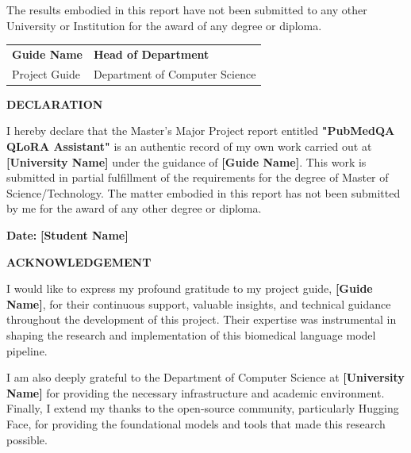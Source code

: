 \documentclass[12pt,a4paper]{report}
\begin{document}
The results embodied in this report have not been submitted to any other University or Institution for the award of any degree or diploma.

\vspace{3cm}
\noindent
\begin{tabular}{@{}p{}p{}@{}}
\textbf{Guide Name} & \textbf{Head of Department} \\
Project Guide & Department of Computer Science \\
\end{tabular}

\newpage
\thispagestyle{empty}
\begin{center}
    \Large \textbf{DECLARATION}
\end{center}
\vspace{1cm}
I hereby declare that the Master's Major Project report entitled \textbf{"PubMedQA QLoRA Assistant"} is an authentic record of my own work carried out at \textbf{[University Name]} under the guidance of \textbf{[Guide Name]}. This work is submitted in partial fulfillment of the requirements for the degree of Master of Science/Technology. The matter embodied in this report has not been submitted by me for the award of any other degree or diploma.

\vspace{3cm}
\noindent
\textbf{Date:} \hspace{8cm} \textbf{[Student Name]}

\newpage
\thispagestyle{empty}
\begin{center}
    \Large \textbf{ACKNOWLEDGEMENT}
\end{center}
\vspace{1cm}
I would like to express my profound gratitude to my project guide, \textbf{[Guide Name]}, for their continuous support, valuable insights, and technical guidance throughout the development of this project. Their expertise was instrumental in shaping the research and implementation of this biomedical language model pipeline.

I am also deeply grateful to the Department of Computer Science at \textbf{[University Name]} for providing the necessary infrastructure and academic environment. Finally, I extend my thanks to the open-source community, particularly Hugging Face, for providing the foundational models and tools that made this research possible.
\end{document}
